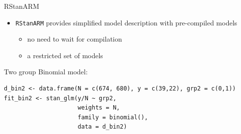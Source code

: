 \documentclass[finnish,english,t]{beamer}
\begin{document}
\begin{frame}[fragile]{RStanARM}

  \begin{itemize}
  \item \texttt{RStanARM} provides simplified model description with
    pre-compiled models
    \begin{itemize}
    \item no need to wait for compilation
    \item a restricted set of models
    \end{itemize}
  \end{itemize}

Two group Binomial model:
  {\footnotesize
\begin{verbatim}
d_bin2 <- data.frame(N = c(674, 680), y = c(39,22), grp2 = c(0,1))
fit_bin2 <- stan_glm(y/N ~ grp2,
                     weights = N,
                     family = binomial(),
                     data = d_bin2)
\end{verbatim}
  }

    
\end{frame} 
\end{document}

